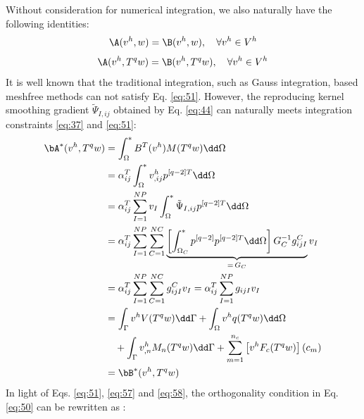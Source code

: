 Without consideration for numerical integration, we also naturally have the following identities:
\begin{equation}\label{eq:57}
\A(v^{h},w)=\B(v^{h},w),\quad \forall v^{h}\in V^{h}
\end{equation}
\begin{equation}\label{eq:58}
\A(v^{h},T^{q}w)=\B(v^{h},T^{q}w),\quad \forall v^{h}\in V^{h}
\end{equation}
It is well known that the traditional integration, such as Gauss integration, based meshfree methods can not satisfy Eq. \eqref{eq:51}.
However, the reproducing kernel smoothing gradient $\tilde{\Psi}_{I,ij}$ obtained by Eq. \eqref{eq:44} can naturally meets integration constraints \eqref{eq:37} and \eqref{eq:51}:
\begin{equation}\label{eq:59}
\begin{aligned}
\bA^{*}(v^{h},T^{q}w)&=\int_{\Omega}^{*}B^{T}(v^{h})M(T^{q}w)\dd\Omega\\
&=\alpha_{ij}^{T}\int_{\Omega}^{*}v^{h}_{,ij}p^{[q-2]T}\dd\Omega\\
&=\alpha_{ij}^{T}\sum_{I=1}^{NP}v_I\int_{\Omega}^{*}\tilde{\Psi}_{I,ij}p^{[q-2]T}\dd\Omega\\
&=\alpha_{ij}^{T}\sum_{I=1}^{NP}\sum_{C=1}^{NC}\underbrace{\left[\int_{\Omega_C}^{*}p^{[q-2]}p^{[q-2]T}\dd\Omega\right]G_C^{-1}g_{ijI}^{C}}_{=\,G_C}v_I\\
&=\alpha_{ij}^{T}\sum_{I=1}^{NP}\sum_{C=1}^{NC}g_{ijI}^{C}v_I
=\alpha_{ij}^{T}\sum_{I=1}^{NP}g_{ijI}v_I\\
&=\int_{\Gamma}v^{h}V(T^{q}w)\dd\Gamma+\int_{\Omega}v^{h}q(T^{q}w)\dd\Omega\\
&\quad+\int_{\Gamma}v^{h}_{,n}M_n(T^{q}w)\dd\Gamma
+\sum_{m=1}^{n_c}\left[v^{h}F_c(T^{q}w)\right](c_m)\\
&=\bB^{*}(v^{h},T^{q}w)
\end{aligned}
\end{equation}
In light of Eqs. \eqref{eq:51}, \eqref{eq:57} and \eqref{eq:58}, the orthogonality condition in Eq. \eqref{eq:50} can be rewritten as \cite{ref50}:
